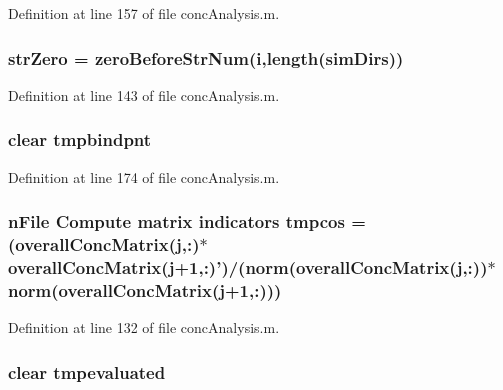 Definition at line 157 of file conc\-Analysis.\-m.

\hypertarget{a00025_ab253e75f6224bf843e7a5ff2fb472e7d}{
\subsubsection[{str\-Zero}]{\setlength{\rightskip}{0pt plus 5cm}str\-Zero = zero\-Before\-Str\-Num({\bf i},length({\bf sim\-Dirs}))}}\label{a00025_ab253e75f6224bf843e7a5ff2fb472e7d}


Definition at line 143 of file conc\-Analysis.\-m.

\hypertarget{a00025_a5767512ebb74a4931fc7193b57426f9f}{
\subsubsection[{tmpbindpnt}]{\setlength{\rightskip}{0pt plus 5cm}clear tmpbindpnt}}\label{a00025_a5767512ebb74a4931fc7193b57426f9f}


Definition at line 174 of file conc\-Analysis.\-m.

\hypertarget{a00025_ab6beb59ba238329bfb9d4ed5a5486c5e}{
\subsubsection[{tmpcos}]{ {\bf n\-File} Compute matrix indicators tmpcos = ({\bf overall\-Conc\-Matrix}({\bf j},\-:)$\ast${\bf overall\-Conc\-Matrix}({\bf j}+1,\-:)')/(norm({\bf overall\-Conc\-Matrix}({\bf j},\-:))$\ast$norm({\bf overall\-Conc\-Matrix}({\bf j}+1,\-:)))}}\label{a00025_ab6beb59ba238329bfb9d4ed5a5486c5e}


Definition at line 132 of file conc\-Analysis.\-m.

\hypertarget{a00025_a4e591f841c52d48a504874598be0542a}{
\subsubsection[{tmpevaluated}]{\setlength{\rightskip}{0pt plus 5cm}clear tmpevaluated}}\label{a00025_a4e591f841c52d48a504874598be0542a}


